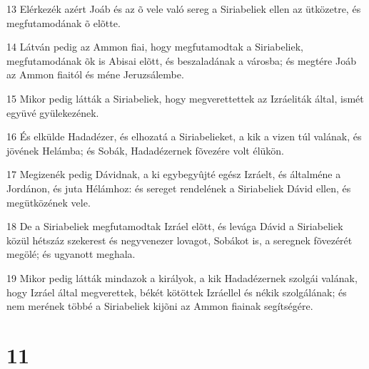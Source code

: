 \par 13 Elérkezék azért Joáb és az õ vele való sereg a Siriabeliek ellen az ütközetre, és megfutamodának õ elõtte.
\par 14 Látván pedig az Ammon fiai, hogy megfutamodtak a Siriabeliek, megfutamodának õk is Abisai elõtt, és beszaladának a városba; és megtére Joáb az Ammon fiaitól és méne Jeruzsálembe.
\par 15 Mikor pedig látták a Siriabeliek, hogy megverettettek az Izráeliták által, ismét együvé gyülekezének.
\par 16 És elkülde Hadadézer, és elhozatá a Siriabelieket, a kik a vizen túl valának, és jövének Helámba; és Sobák, Hadadézernek fõvezére volt élükön.
\par 17 Megizenék pedig Dávidnak, a ki egybegyûjté egész Izráelt, és általméne a Jordánon, és juta Hélámhoz: és sereget rendelének a Siriabeliek Dávid ellen, és megütközének vele.
\par 18 De a Siriabeliek megfutamodtak Izráel elõtt, és levága Dávid a Siriabeliek közül hétszáz szekerest és negyvenezer lovagot, Sobákot is, a seregnek fõvezérét megölé; és ugyanott meghala.
\par 19 Mikor pedig látták mindazok a királyok, a kik Hadadézernek szolgái valának, hogy Izráel által megverettek, békét kötöttek Izráellel és nékik szolgálának; és nem merének többé a Siriabeliek kijõni az Ammon fiainak segítségére.

\chapter{11}

